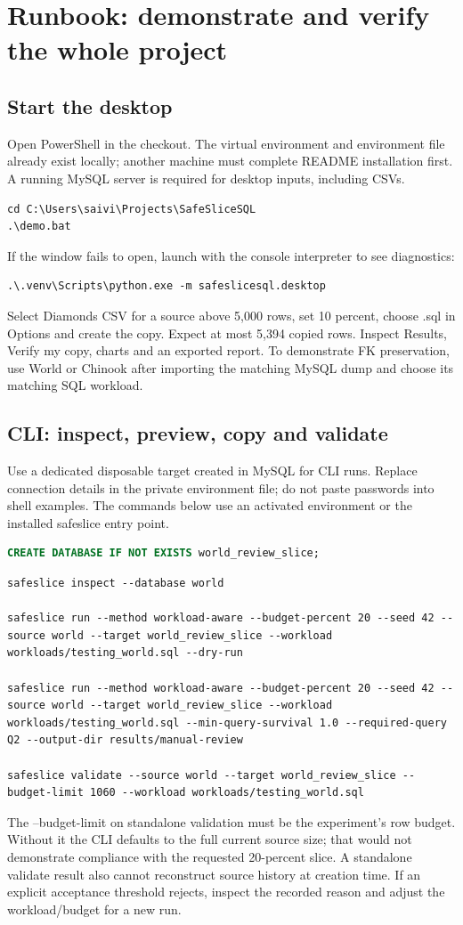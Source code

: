 \documentclass[11pt,a4paper,oneside]{report}
\begin{document}
\chapter{Runbook: demonstrate and verify the whole project}
\section{Start the desktop}
Open PowerShell in the checkout. The virtual environment and environment file already exist locally; another machine must complete README installation first. A running MySQL server is required for desktop inputs, including CSVs.
\begin{lstlisting}[language={}]
cd C:\Users\saivi\Projects\SafeSliceSQL
.\demo.bat
\end{lstlisting}
If the window fails to open, launch with the console interpreter to see diagnostics:
\begin{lstlisting}[language={}]
.\.venv\Scripts\python.exe -m safeslicesql.desktop
\end{lstlisting}
Select Diamonds CSV for a source above 5,000 rows, set 10 percent, choose .sql in Options and create the copy. Expect at most 5,394 copied rows. Inspect Results, Verify my copy, charts and an exported report. To demonstrate FK preservation, use World or Chinook after importing the matching MySQL dump and choose its matching SQL workload.

\section{CLI: inspect, preview, copy and validate}
Use a dedicated disposable target created in MySQL for CLI runs. Replace connection details in the private environment file; do not paste passwords into shell examples. The commands below use an activated environment or the installed safeslice entry point.
\begin{lstlisting}[language=SQL]
CREATE DATABASE IF NOT EXISTS world_review_slice;
\end{lstlisting}
\begin{lstlisting}[language={}]
safeslice inspect --database world

safeslice run --method workload-aware --budget-percent 20 --seed 42 --source world --target world_review_slice --workload workloads/testing_world.sql --dry-run

safeslice run --method workload-aware --budget-percent 20 --seed 42 --source world --target world_review_slice --workload workloads/testing_world.sql --min-query-survival 1.0 --required-query Q2 --output-dir results/manual-review

safeslice validate --source world --target world_review_slice --budget-limit 1060 --workload workloads/testing_world.sql
\end{lstlisting}
The --budget-limit on standalone validation must be the experiment's row budget. Without it the CLI defaults to the full current source size; that would not demonstrate compliance with the requested 20-percent slice. A standalone validate result also cannot reconstruct source history at creation time. If an explicit acceptance threshold rejects, inspect the recorded reason and adjust the workload/budget for a new run.
\end{document}
